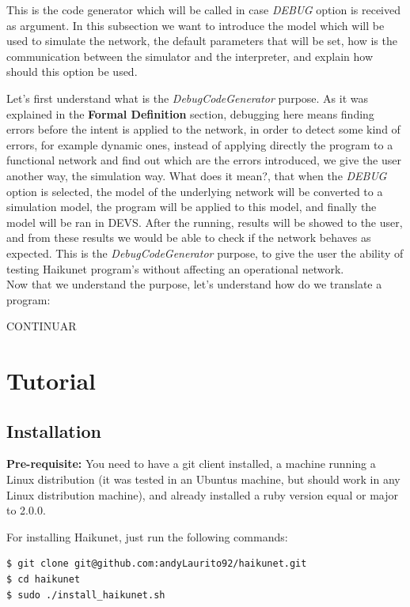 This is the code generator which will be called in case \textit{DEBUG} option is received as argument. In this subsection we want to introduce the model which will be used to simulate the network, the default parameters that will be set, how is the communication between the simulator and the interpreter, and explain how should this option be used.

Let's first understand what is the \textit{DebugCodeGenerator} purpose. As it was explained in the \textbf{Formal Definition} section, debugging here means finding errors before the intent is applied to the network, in order to detect some kind of errors, for example dynamic ones, instead of applying directly the program to a functional network and find out which are the errors introduced, we give the user another way, the simulation way. What does it mean?, that when the \textit{DEBUG} option is selected, the model of the underlying network will be converted to a simulation model, the program will be applied to this model, and finally the model will be ran in DEVS. After the running, results will be showed to the user, and from these results we would be able to check if the network behaves as expected. This is the \textit{DebugCodeGenerator} purpose, to give the user the ability of testing Haikunet program's without affecting an operational network.\\
Now that we understand the purpose, let's understand how do we translate a program:

CONTINUAR

\section{Tutorial}

\subsection{Installation}

\textbf{Pre-requisite:} You need to have a git client installed, a machine running a Linux distribution (it was tested in an Ubuntus machine, but should work in any Linux distribution machine), and already installed a ruby version equal or major to 2.0.0.

For installing Haikunet, just run the following commands:

\begin{lstlisting}[language=bash,breaklines=true]
$ git clone git@github.com:andyLaurito92/haikunet.git
$ cd haikunet
$ sudo ./install_haikunet.sh 
\end{lstlisting}

